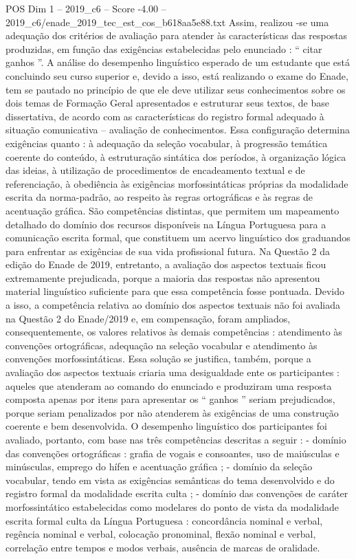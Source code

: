 \begin{textsample}{POS Dim 1 – 2019\_c6 – Score -4.00 – 2019\_c6/enade\_2019\_tec\_est\_cos\_b618aa5e88.txt}
Assim, realizou -se uma adequação dos critérios de avaliação para atender às características das respostas produzidas, em função das exigências estabelecidas pelo enunciado : “ citar ganhos ”.
A análise do desempenho linguístico esperado de um estudante que está concluindo seu curso superior e, devido a isso, está realizando o exame do Enade, tem se pautado no princípio de que ele deve utilizar seus conhecimentos sobre os dois temas de Formação Geral apresentados e estruturar seus textos, de base dissertativa, de acordo com as características do registro formal adequado à situação comunicativa – avaliação de conhecimentos.
Essa configuração determina exigências quanto : à adequação da seleção vocabular, à progressão temática coerente do conteúdo, à estruturação sintática dos períodos, à organização lógica das ideias, à utilização de procedimentos de encadeamento textual e de referenciação, à obediência às exigências morfossintáticas próprias da modalidade escrita da norma-padrão, ao respeito às regras ortográficas e às regras de acentuação gráfica.
São competências distintas, que permitem um mapeamento detalhado do domínio dos recursos disponíveis na Língua Portuguesa para a comunicação escrita formal, que constituem um acervo linguístico dos graduandos para enfrentar as exigências de sua vida profissional futura.
Na Questão 2 da edição do Enade de 2019, entretanto, a avaliação dos aspectos textuais ficou extremamente prejudicada, porque a maioria das respostas não apresentou material linguístico suficiente para que essa competência fosse pontuada.
Devido a isso, a competência relativa ao domínio dos aspectos textuais não foi avaliada na Questão 2 do Enade/2019 e, em compensação, foram ampliados, consequentemente, os valores relativos às demais competências : atendimento às convenções ortográficas, adequação na seleção vocabular e atendimento às convenções morfossintáticas.
Essa solução se justifica, também, porque a avaliação dos aspectos textuais criaria uma desigualdade ente os participantes : aqueles que atenderam ao comando do enunciado e produziram uma resposta composta apenas por itens para apresentar os “ ganhos ” seriam prejudicados, porque seriam penalizados por não atenderem às exigências de uma construção coerente e bem desenvolvida.
O desempenho linguístico dos participantes foi avaliado, portanto, com base nas três competências descritas a seguir : - domínio das convenções ortográficas : grafia de vogais e consoantes, uso de maiúsculas e minúsculas, emprego do hífen e acentuação gráfica ; - domínio da seleção vocabular, tendo em vista as exigências semânticas do tema desenvolvido e do registro formal da modalidade escrita culta ; - domínio das convenções de caráter morfossintático estabelecidas como modelares do ponto de vista da modalidade escrita formal culta da Língua Portuguesa : concordância nominal e verbal, regência nominal e verbal, colocação pronominal, flexão nominal e verbal, correlação entre tempos e modos verbais, ausência de marcas de oralidade.

\end{textsample}
